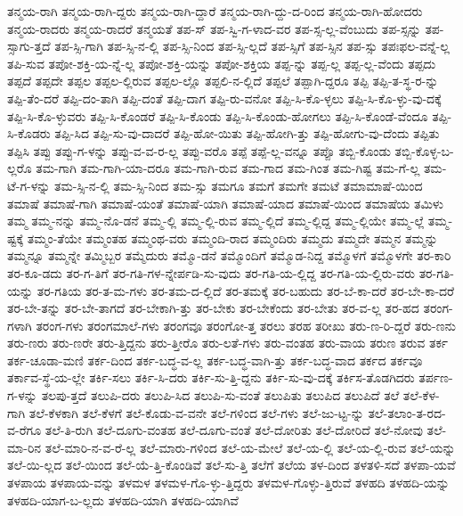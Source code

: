 {ತನ್ಮಯ-ರಾಗಿ
ತನ್ಮಯ-ರಾಗಿ-ದ್ದರು
ತನ್ಮಯ-ರಾಗಿ-ದ್ದಾರೆ
ತನ್ಮಯ-ರಾಗಿ-ದ್ದು-ದ-ರಿಂದ
ತನ್ಮಯ-ರಾಗಿ-ಹೋದರು
ತನ್ಮಯ-ರಾದರು
ತನ್ಮಯ-ರಾದರೆ
ತನ್ಮಯತೆ
ತಪ-ಸ್
ತಪ-ಸ್ವಿ-ಗ-ಳಾದ-ವರ
ತಪ-ಸ್ಸ-ಲ್ಲ-ವೆಂಬುದು
ತಪ-ಸ್ಸನ್ನು
ತಪ-ಸ್ಸಾಗು-ತ್ತದೆ
ತಪ-ಸ್ಸಿ-ಗಾಗಿ
ತಪ-ಸ್ಸಿ-ನ-ಲ್ಲಿ
ತಪ-ಸ್ಸಿ-ನಿಂದ
ತಪ-ಸ್ಸಿ-ಲ್ಲದೆ
ತಪ-ಸ್ಸಿಗೆ
ತಪ-ಸ್ಸಿನ
ತಪ-ಸ್ಸು
ತಪಃಫಲ-ವನ್ನೆ-ಲ್ಲ
ತಪಿ-ಸುವ
ತಪೋ-ಶಕ್ತಿ-ಯ-ನ್ನೆ-ಲ್ಲ
ತಪೋ-ಶಕ್ತಿ-ಯನ್ನು
ತಪೋ-ಶಕ್ತಿಯ
ತಪ್ಪ-ನ್ನು
ತಪ್ಪ-ಲ್ಲ
ತಪ್ಪ-ಲ್ಲ-ವೆಂದು
ತಪ್ಪದು
ತಪ್ಪದೆ
ತಪ್ಪದೇ
ತಪ್ಪಲ
ತಪ್ಪಲ-ಲ್ಲಿರುವ
ತಪ್ಪಲ-ಲ್ಲೊ
ತಪ್ಪಲಿ-ನ-ಲ್ಲಿದೆ
ತಪ್ಪಲೆ
ತಪ್ಪಾಗಿ-ದ್ದರೂ
ತಪ್ಪಿ
ತಪ್ಪಿ-ತ-ಸ್ಥ-ರ-ನ್ನು
ತಪ್ಪಿ-ತೆಂ-ದರೆ
ತಪ್ಪಿ-ದಂ-ತಾಗಿ
ತಪ್ಪಿ-ದಂತೆ
ತಪ್ಪಿ-ದಾಗ
ತಪ್ಪಿ-ರು-ವನೋ
ತಪ್ಪಿ-ಸಿ-ಕೊ-ಳ್ಳಲು
ತಪ್ಪಿ-ಸಿ-ಕೊ-ಳ್ಳು-ವು-ದಕ್ಕೆ
ತಪ್ಪಿ-ಸಿ-ಕೊ-ಳ್ಳುವರು
ತಪ್ಪಿ-ಸಿ-ಕೊಂಡರೆ
ತಪ್ಪಿ-ಸಿ-ಕೊಂಡು
ತಪ್ಪಿ-ಸಿ-ಕೊಂಡು-ಹೋಗಲು
ತಪ್ಪಿ-ಸಿ-ಕೊಂಡೆ-ವೆಂದೂ
ತಪ್ಪಿ-ಸಿ-ಕೊಡರು
ತಪ್ಪಿ-ಸಿದ
ತಪ್ಪಿ-ಸು-ವು-ದಾದರೆ
ತಪ್ಪಿ-ಹೋ-ಯಿತು
ತಪ್ಪಿ-ಹೋಗಿ-ತ್ತು
ತಪ್ಪಿ-ಹೋಗು-ವು-ದೆಂದು
ತಪ್ಪಿತು
ತಪ್ಪಿಸಿ
ತಪ್ಪು
ತಪ್ಪು-ಗ-ಳನ್ನು
ತಪ್ಪು-ವ-ವ-ರ-ಲ್ಲ
ತಪ್ಪು-ವರೊ
ತಪ್ಪೆ
ತಪ್ಪೆ-ಲ್ಲ-ವನ್ನೂ
ತಪ್ಪೊ
ತಬ್ಬಿ-ಕೊಂಡು
ತಬ್ಬಿ-ಕೊಳ್ಳ-ಬ-ಲ್ಲರೊ
ತಮ-ಗಾಗಿ
ತಮ-ಗಾಗಿ-ಯಾ-ದರೂ
ತಮ-ಗಾಗಿ-ರುವ
ತಮ-ಗಾದ
ತಮ-ಗಿಂತ
ತಮ-ಗಿಷ್ಟ
ತಮ-ಗೆ-ಲ್ಲ
ತಮ-ಟೆ-ಗ-ಳನ್ನು
ತಮ-ಸ್ಸಿ-ನ-ಲ್ಲಿ
ತಮ-ಸ್ಸಿ-ನಿಂದ
ತಮ-ಸ್ಸು
ತಮಗೂ
ತಮಗೆ
ತಮಗೇ
ತಮಟೆ
ತಮಾಮಾಷೆ-ಯಿಂದ
ತಮಾಷೆ
ತಮಾಷೆ-ಗಾಗಿ
ತಮಾಷೆ-ಯಂತೆ
ತಮಾಷೆ-ಯಾಗಿ
ತಮಾಷೆ-ಯಾದ
ತಮಾಷೆ-ಯಿಂದ
ತಮಾಷೆಯ
ತಮಿಳು
ತಮ್ಮ
ತಮ್ಮ-ನನ್ನು
ತಮ್ಮ-ನೊ-ಡನೆ
ತಮ್ಮ-ಲ್ಲಿ
ತಮ್ಮ-ಲ್ಲಿ-ರುವ
ತಮ್ಮ-ಲ್ಲಿದೆ
ತಮ್ಮ-ಲ್ಲಿದ್ದ
ತಮ್ಮ-ಲ್ಲಿಯೇ
ತಮ್ಮ-ಲ್ಲೆ
ತಮ್ಮ-ಷ್ಟಕ್ಕೆ
ತಮ್ಮಂ-ತೆಯೇ
ತಮ್ಮಂತಹ
ತಮ್ಮಂಥ-ವರು
ತಮ್ಮಂದಿ-ರಾದ
ತಮ್ಮಂದಿರು
ತಮ್ಮದು
ತಮ್ಮದೇ
ತಮ್ಮನ
ತಮ್ಮನ್ನು
ತಮ್ಮನ್ನೂ
ತಮ್ಮನ್ನೇ
ತಮ್ಮಿಬ್ಬರ
ತಮ್ಮೆದುರು
ತಮ್ಮೊ-ಡನೆ
ತಮ್ಮೊಂದಿಗೆ
ತಮ್ಮೊಡ-ನಿದ್ದ
ತಮ್ಮೊಳಗೆ
ತಮ್ಮೊಳಗೇ
ತರ-ಕಾರಿ
ತರ-ಕೂ-ಡದು
ತರ-ಗ-ತಿಗೆ
ತರ-ಗತಿ-ಗಳ-ನ್ನೇರ್ಪಡಿ-ಸು-ವುದು
ತರ-ಗತಿ-ಯ-ಲ್ಲಿದ್ದ
ತರ-ಗತಿ-ಯ-ಲ್ಲಿರು-ವರು
ತರ-ಗತಿ-ಯನ್ನು
ತರ-ಗತಿಯ
ತರ-ತ-ಮ-ಗಳು
ತರ-ತಮ-ದ-ಲ್ಲಿದೆ
ತರ-ತಮಕ್ಕೆ
ತರ-ಬಹುದು
ತರ-ಬೆ-ಕಾ-ದರೆ
ತರ-ಬೇ-ಕಾ-ದರೆ
ತರ-ಬೇ-ತನ್ನು
ತರ-ಬೇ-ತಾಗದೆ
ತರ-ಬೇಕಾಗಿ-ತ್ತು
ತರ-ಬೇಕು
ತರ-ಬೇಕೆಂದು
ತರ-ಬೇತು
ತರ-ವ-ಲ್ಲ
ತರ-ಹದ
ತರಂಗ-ಗಳಾಗಿ
ತರಂಗ-ಗಳು
ತರಂಗಮಾಲೆ-ಗಳು
ತರಂಗವೂ
ತರಂಗೋ-ತ್ತ
ತರಲು
ತರಹ
ತರೀಖು
ತರು-ಣ-ರಿ-ದ್ದರೆ
ತರು-ಣನು
ತರು-ಣರು
ತರು-ಣರೇ
ತರು-ತ್ತಿದ್ದನು
ತರು-ತ್ತೀರೊ
ತರು-ಲತೆ-ಗಳು
ತರು-ವಂತಹ
ತರು-ವಾಯ
ತರುಣ
ತರುವ
ತರ್ಕ
ತರ್ಕ-ಚೂಡಾ-ಮಣಿ
ತರ್ಕ-ದಿಂದ
ತರ್ಕ-ಬದ್ಧ-ವ-ಲ್ಲ
ತರ್ಕ-ಬದ್ಧ-ವಾಗಿ-ತ್ತು
ತರ್ಕ-ಬದ್ಧ-ವಾದ
ತರ್ಕದ
ತರ್ಕವೂ
ತರ್ಕಾವ-ಸ್ಥೆ-ಯ-ಲ್ಲೇ
ತರ್ಕಿ-ಸಲು
ತರ್ಕಿ-ಸಿ-ದರು
ತರ್ಕಿ-ಸು-ತ್ತಿ-ದ್ದನು
ತರ್ಕಿ-ಸು-ವು-ದಕ್ಕೆ
ತರ್ಕಿಸ-ತೊಡಗಿದರು
ತರ್ಪಣ-ಗ-ಳನ್ನು
ತಲಪು-ತ್ತದೆ
ತಲುಪಿ-ದರು
ತಲುಪಿ-ಸಿದ
ತಲುಪಿ-ಸು-ವಂತೆ
ತಲುಪಿತು
ತಲುಪಿದ
ತಲುಪಿದೆ
ತಲೆ
ತಲೆ-ಕೆಳ-ಗಾಗಿ
ತಲೆ-ಕೆಳಕಾಗಿ
ತಲೆ-ಕೆಳಗೆ
ತಲೆ-ಕೊಡು-ವ-ವನೇ
ತಲೆ-ಗಳಿಂದ
ತಲೆ-ಗಳು
ತಲೆ-ಜು-ಟ್ಟ-ನ್ನು
ತಲೆ-ತಲಾಂ-ತ-ರದ-ವ-ರೆಗೂ
ತಲೆ-ತಿ-ರುಗಿ
ತಲೆ-ದೂಗು-ವಂತಹ
ತಲೆ-ದೂಗು-ವಂತೆ
ತಲೆ-ದೋರಿತು
ತಲೆ-ದೋರಿದೆ
ತಲೆ-ನೋವು
ತಲೆ-ಮಾ-ರಿನ
ತಲೆ-ಮಾರಿ-ನ-ವ-ರೆ-ಲ್ಲ
ತಲೆ-ಮಾರು-ಗಳಿಂದ
ತಲೆ-ಯ-ಮೇಲೆ
ತಲೆ-ಯ-ಲ್ಲಿ
ತಲೆ-ಯ-ಲ್ಲಿ-ರುವ
ತಲೆ-ಯನ್ನು
ತಲೆ-ಯಿ-ಲ್ಲದ
ತಲೆ-ಯಿಂದ
ತಲೆ-ಯೆ-ತ್ತಿ-ಕೊಂಡಿವೆ
ತಲೆ-ಸು-ತ್ತಿ
ತಲೆಗೆ
ತಲೆಯ
ತಳ-ದಿಂದ
ತಳತಳಿ-ಸದೆ
ತಳಪಾ-ಯವೆ
ತಳಪಾಯ
ತಳಪಾಯ-ವನ್ನು
ತಳಮಳ
ತಳಮಳ-ಗೊ-ಳ್ಳು-ತ್ತಿದ್ದರು
ತಳಮಳ-ಗೊಳ್ಳು-ತ್ತಿರುವೆ
ತಳಹದಿ
ತಳಹದಿ-ಯನ್ನು
ತಳಹದಿ-ಯಾಗ-ಬ-ಲ್ಲದು
ತಳಹದಿ-ಯಾಗಿ
ತಳಹದಿ-ಯಾಗಿವೆ
}
